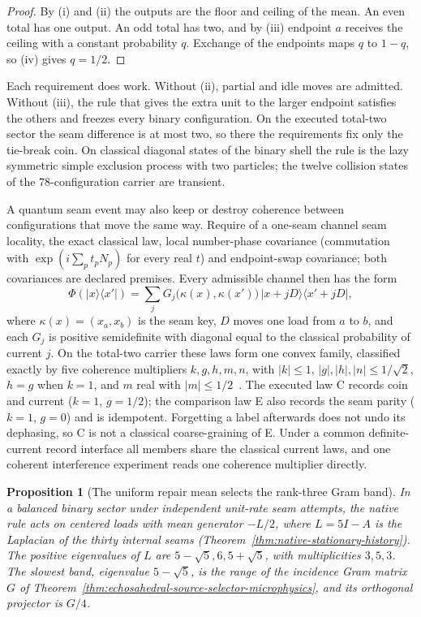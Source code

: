 \documentclass[11pt]{article}
\newtheorem{proposition}[theorem]{Proposition}
\theoremstyle{remark}
\theoremstyle{plain}
\begin{document}
\begin{proof}
By (i) and (ii) the outputs are the floor and ceiling of the mean. An even
total has one output. An odd total has two, and by (iii) endpoint \(a\)
receives the ceiling with a constant probability \(q\). Exchange of the
endpoints maps \(q\) to \(1-q\), so (iv) gives \(q=1/2\).
\end{proof}

Each requirement does work. Without (ii), partial and idle moves are
admitted. Without (iii), the rule that gives the extra unit to the larger
endpoint satisfies the others and freezes every binary configuration. On the
executed total-two sector the seam difference is at most two, so there the
requirements fix only the tie-break coin. On classical diagonal states of
the binary shell the rule is the lazy symmetric simple exclusion process with
two particles; the twelve collision states of the \(78\)-configuration
carrier are transient.

A quantum seam event may also keep or destroy coherence between
configurations that move the same way. Require of a one-seam channel seam
locality, the exact classical law, local number-phase covariance
(commutation with \(\exp(i\sum_pt_pN_p)\) for every real \(t\)) and
endpoint-swap covariance; both covariances are declared premises. Every
admissible channel then has the form
\[
\Phi(|x\rangle\langle x'|)=\sum_jG_j\bigl(\kappa(x),\kappa(x')\bigr)\,
|x+jD\rangle\langle x'+jD|,
\]
where \(\kappa(x)=(x_a,x_b)\) is the seam key, \(D\) moves one load from
\(a\) to \(b\), and each \(G_j\) is positive semidefinite with diagonal equal
to the classical probability of current \(j\). On the total-two carrier these
laws form one convex family, classified exactly by five coherence
multipliers \(k,g,h,m,n\), with \(|k|\le1\), \(|g|,|h|,|n|\le1/\sqrt2\),
\(h=g\) when \(k=1\), and \(m\) real with \(|m|\le1/2\)~\cite{ophmodel}. The
executed law C records coin and current (\(k=1\), \(g=1/2\)); the comparison
law E also records the seam parity (\(k=1\), \(g=0\)) and is idempotent.
Forgetting a label afterwards does not undo its dephasing, so C is not a
classical coarse-graining of E. Under a common definite-current record
interface all members share the classical current laws, and one coherent
interference experiment reads one coherence multiplier directly.

\begin{proposition}[The uniform repair mean selects the rank-three Gram band]
\label{prop:native-rank-three-band}
In a balanced binary sector under independent unit-rate seam attempts, the
native rule acts on centered loads with mean generator \(-L/2\), where \(L=5I-A\) is the
Laplacian of the thirty internal seams
(Theorem~\ref{thm:native-stationary-history}). The positive eigenvalues of
\(L\) are \(5-\sqrt5,6,5+\sqrt5\), with multiplicities \(3,5,3\). The slowest
band, eigenvalue \(5-\sqrt5\), is the range of the incidence Gram matrix
\(G\) of Theorem~\ref{thm:echosahedral-source-selector-microphysics}, and its
orthogonal projector is \(G/4\).
\end{proposition}
\end{document}
